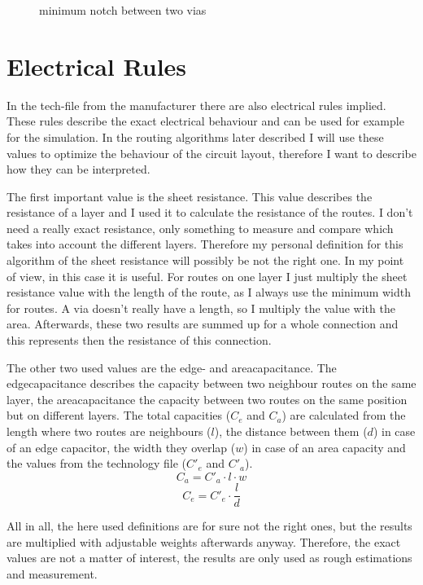\begin{figure}
	\centering
	
	\caption{minimum notch between two vias}
	\label{fig:technology_rule_notch}
\end{figure}

\section{Electrical Rules}
\label{sec:electrical_rules}
In the tech-file from the manufacturer there are also electrical rules implied. These rules describe the exact electrical behaviour and can be used for example for the simulation. In the routing algorithms later described I will use these values to optimize the behaviour of the circuit layout, therefore I want to describe how they can be interpreted.

The first important value is the sheet resistance. This value describes the resistance of a layer and I used it to calculate the resistance of the routes. I don't need a really exact resistance, only something to measure and compare which takes into account the different layers. Therefore my personal definition for this algorithm of the sheet resistance will possibly be not the right one. In my point of view, in this case it is useful. For routes on one layer I just multiply the sheet resistance value with the length of the route, as I always use the minimum width for routes. A via doesn't really have a length, so I multiply the value with the area. Afterwards, these two results are  summed up for a whole connection and this represents then the resistance of this connection.

The other two used values are the edge- and areacapacitance. The edgecapacitance describes the capacity between two neighbour routes on the same layer, the areacapacitance the capacity between two routes on the same position but on different layers. The total capacities ($C_e$ and $C_a$) are calculated from the length where two routes are neighbours ($l$), the distance between them ($d$) in case of an edge capacitor, the width they overlap ($w$) in case of an area capacity and the values from the technology file ($C'_e$ and $C'_a$).
\[C_a = C'_a \cdot l \cdot w\]
\[C_e = C'_e \cdot \frac{l}{d}\]

All in all, the here used definitions are for sure not the right ones, but the results are multiplied with adjustable weights afterwards anyway. Therefore, the exact values are not a matter of interest, the results are only used as rough estimations and measurement.





